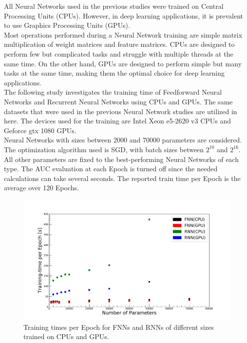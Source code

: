 All Neural Networks used in the previous studies were trained on Central Processing Units (CPUs). However, in deep learning applications, it is prevalent to use Graphics Processing Units (GPUs). \\
Most operations performed during a Neural Network training are simple matrix multiplication of weight matrices and feature matrices. CPUs are designed to perform few but complicated tasks and struggle with multiple threads at the same time. On the other hand, GPUs are designed to perform simple but many tasks at the same time, making them the optimal choice for deep learning applications. \\
The following study investigates the training time of Feedforward Neural Networks and Recurrent Neural Networks using CPUs and GPUs.
The same datasets that were used in the previous Neural Network studies are utilized in here. The devices used for the training are Intel Xeon e5-2620 v3 CPUs and Geforce gtx 1080 GPUs. \\
Neural Networks with sizes between 2000 and 70000 parameters are considered. The optimization algorithm used is SGD, with batch sizes between $2^{10}$ and $2^{16}$. All other parameters are fixed to the best-performing Neural Networks of each type. The AUC evaluation at each Epoch is turned off since the needed calculations can take several seconds. The reported train time per Epoch is the average over 120 Epochs. \\

\begin{figure}[H]
\centering
\includegraphics[width=\linewidth]{figs/CPUGPU/NumParaTraintime_Fixed}
\caption{Training times per Epoch for FNNs and RNNs of different sizes trained on CPUs and GPUs.}
\label{fig:CPUGPUPara}
\end{figure}

